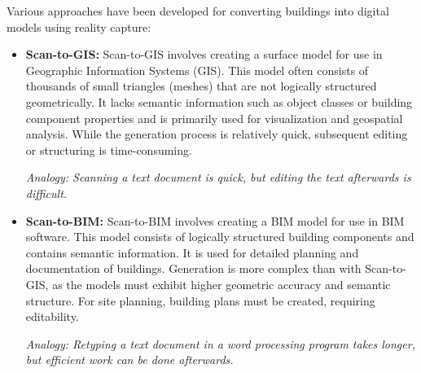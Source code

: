 \begin{English}
    Various approaches have been developed for converting buildings into digital models using reality capture:

    \begin{itemize}
        \item \textbf{Scan-to-GIS:} Scan-to-GIS involves creating a surface model for use in Geographic Information Systems (GIS). This model often consists of thousands of small triangles (meshes) that are not logically structured geometrically. It lacks semantic information such as object classes or building component properties and is primarily used for visualization and geospatial analysis. While the generation process is relatively quick, subsequent editing or structuring is time-consuming.
        
        \textit{Analogy: Scanning a text document is quick, but editing the text afterwards is difficult.}

        \item \textbf{Scan-to-BIM:} Scan-to-BIM involves creating a BIM model for use in BIM software. This model consists of logically structured building components and contains semantic information. It is used for detailed planning and documentation of buildings. Generation is more complex than with Scan-to-GIS, as the models must exhibit higher geometric accuracy and semantic structure. For site planning, building plans must be created, requiring editability.
        
        \textit{Analogy: Retyping a text document in a word processing program takes longer, but efficient work can be done afterwards.}
    \end{itemize}
\end{English}


